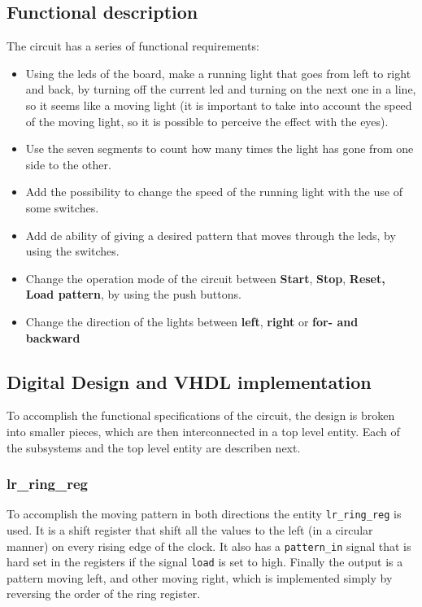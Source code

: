 \documentclass[12pt]{article}   	%
\begin{document}
\subsection{Functional description}
The circuit has a series of functional requirements:
\begin{itemize}
\item Using the leds of the board, make a running light that goes from left to right and back, by turning off the current led and turning on the next one in a line, so it seems like a moving light (it is important to take into account the speed of the moving light, so it is possible to perceive the effect with the eyes).
\item Use the seven segments to count how many times the light has gone from one side to the other.
\item Add the possibility to change the speed of the running light with the use of some switches.
\item Add de ability of giving a desired pattern that moves through the leds, by using the switches.
\item Change the operation mode of the circuit between \textbf{Start}, \textbf{Stop}, \textbf{Reset, Load pattern}, by using the push buttons.
\item Change the direction of the lights between \textbf{left}, \textbf{right} or \textbf{for- and backward}
\end{itemize}

\subsection{Digital Design and VHDL implementation}
To accomplish the functional specifications of the circuit, the design is broken into smaller pieces, which are then interconnected in a top level entity. Each of the subsystems and the top level entity are describen next.


\subsubsection{lr\_ring\_reg}
To accomplish the moving pattern in both directions the entity \lstinline{lr_ring_reg} is used. It is a shift register that shift all the values to the left (in a circular manner) on every rising edge of the clock. It also has a \lstinline{pattern_in} signal that is hard set in the registers if the signal \lstinline{load} is set to high. Finally the output is a pattern moving left, and other moving right, which is implemented simply by reversing the order of the ring register.
\end{document}
